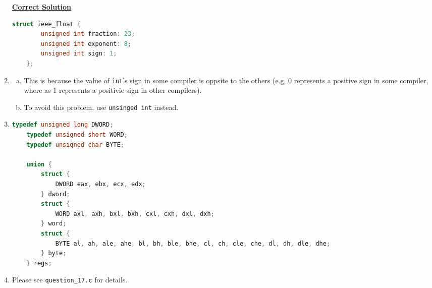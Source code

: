 \documentclass[12pt]{article}
\begin{document}
\begin{enumerate}[1.]
    \begin{mdframed}
    \underline{\textbf{Correct Solution}}

    \bigskip

\begin{lstlisting}[language=c]
    struct ieee_float {
        unsigned int fraction: 23;
        unsigned int exponent: 8;
        unsigned int sign: 1;
    };
\end{lstlisting}
    \end{mdframed}

    \item

    \begin{enumerate}[a)]
        \item

        This is because the value of \texttt{int}'s sign in some compiler is
        oppsite to the others (e.g. 0 represents a positive sign in some compiler,
        where as 1 represents a positivie sign in other compilers).

        \item

        To avoid this problem, use \texttt{unsinged int} instead.
    \end{enumerate}

    \item

\begin{lstlisting}[language=c]
    typedef unsigned long DWORD;
    typedef unsigned short WORD;
    typedef unsigned char BYTE;

    union {
        struct {
            DWORD eax, ebx, ecx, edx;
        } dword;
        struct {
            WORD axl, axh, bxl, bxh, cxl, cxh, dxl, dxh;
        } word;
        struct {
            BYTE al, ah, ale, ahe, bl, bh, ble, bhe, cl, ch, cle, che, dl, dh, dle, dhe;
        } byte;
    } regs;
\end{lstlisting}

    \item

    Please see \texttt{question\_17.c} for details.

\end{enumerate}
\end{document}
